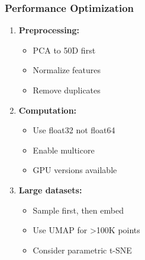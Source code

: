 \documentclass[aspectratio=169]{beamer}
\begin{document}
\begin{frame}
\frametitle{Performance Optimization}

\begin{enumerate}
\item \textbf{Preprocessing:}
\begin{itemize}
\item PCA to 50D first
\item Normalize features
\item Remove duplicates
\end{itemize}

\item \textbf{Computation:}
\begin{itemize}
\item Use float32 not float64
\item Enable multicore
\item GPU versions available
\end{itemize}

\item \textbf{Large datasets:}
\begin{itemize}
\item Sample first, then embed
\item Use UMAP for >100K points
\item Consider parametric t-SNE
\end{itemize}
\end{enumerate}

\end{frame}
\end{document}
